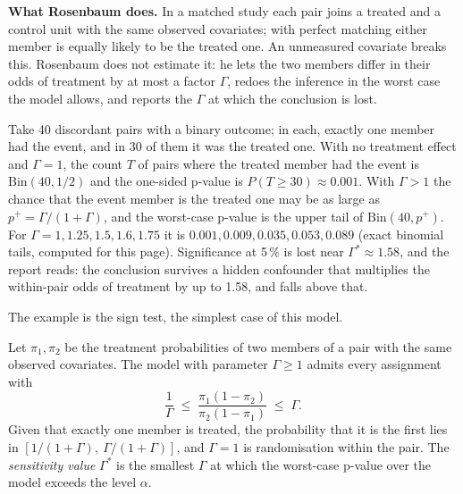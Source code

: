 \textbf{What Rosenbaum does.} In a matched study each pair joins a treated and a control unit with
the same observed covariates; with perfect matching either member is equally likely to be the treated
one. An unmeasured covariate breaks this. Rosenbaum does not estimate it: he lets the two members
differ in their odds of treatment by at most a factor $\Gamma$, redoes the inference in the worst case
the model allows, and reports the $\Gamma$ at which the conclusion is lost.

\begin{exemplo}
Take 40 discordant pairs with a binary outcome; in each, exactly one member had the event, and in
30 of them it was the treated one. With no treatment effect and $\Gamma = 1$, the count $T$ of
pairs where the treated member had the event is $\mathrm{Bin}(40, 1/2)$ and the one-sided p-value is
$P(T \ge 30) \approx 0.001$. With $\Gamma > 1$ the chance that the event member is the treated one
may be as large as $p^{+} = \Gamma/(1+\Gamma)$, and the worst-case p-value is the upper tail of
$\mathrm{Bin}(40, p^{+})$. For $\Gamma = 1, 1.25, 1.5, 1.6, 1.75$ it is $0.001, 0.009, 0.035, 0.053,
0.089$ (exact binomial tails, computed for this page). Significance at 5\,\% is lost near
$\Gamma^{*} \approx 1.58$, and the report reads: the conclusion survives a hidden confounder that
multiplies the within-pair odds of treatment by up to 1.58, and falls above that.
\end{exemplo}

The example is the sign test, the simplest case of this model.

\begin{definicao}
Let $\pi_{1}, \pi_{2}$ be the treatment probabilities of two members of a pair with the same observed
covariates. The model with parameter $\Gamma \ge 1$ admits every assignment with
\[
\frac{1}{\Gamma} \;\le\; \frac{\pi_{1}(1-\pi_{2})}{\pi_{2}(1-\pi_{1})} \;\le\; \Gamma .
\]
Given that exactly one member is treated, the probability that it is the first lies in
$[1/(1+\Gamma),\ \Gamma/(1+\Gamma)]$, and $\Gamma = 1$ is randomisation within the pair. The
\emph{sensitivity value} $\Gamma^{*}$ is the smallest $\Gamma$ at which the worst-case p-value over
the model exceeds the level $\alpha$.
\end{definicao}


